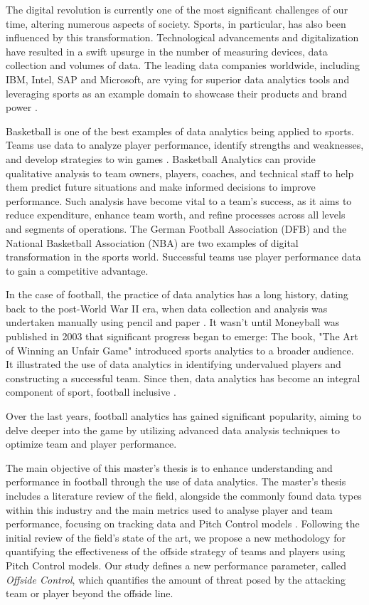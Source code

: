 \documentclass[
  10pt,
  twoside,nohyper]{book}
\begin{document}
The digital revolution is currently one of the most significant
challenges of our time, altering numerous aspects of society. Sports,
in particular, has also been influenced by this transformation.
Technological advancements and digitalization have resulted in a swift
upsurge in the number of measuring devices, data collection and volumes
of data. The leading data companies worldwide, including IBM, Intel, SAP
and Microsoft, are vying for superior data analytics tools and
leveraging sports as an example domain to showcase their products and
brand power \citep{1}.

Basketball is one of the best examples of data analytics being
applied to sports. Teams use data to analyze player performance, identify strengths and weaknesses, and develop strategies to win games \citep{2}. Basketball Analytics can provide qualitative analysis to team owners, players, coaches, and technical staff to help them predict future situations and make informed decisions to improve performance. Such analysis have become vital to a team's success, as it aims to reduce expenditure, enhance team worth, and refine processes across all levels and segments of operations. The German Football Association (DFB) and the National Basketball Association (NBA) are two examples of digital transformation in the sports world. Successful teams use player performance data to gain a competitive advantage.

In the case of football, the practice of data analytics has a long history, dating
back to the post-World War II era, when data collection and analysis was
undertaken manually using pencil and paper \citep{1}. It wasn't until
Moneyball was published in 2003 that significant progress began to
emerge: The book, "The Art of Winning an Unfair Game" introduced
sports analytics to a broader audience. It illustrated the use of data
analytics in identifying undervalued players and constructing a
successful team. Since then, data analytics has become an integral
component of sport, football inclusive \citep{1}.

Over the last years, football analytics has gained significant
popularity, aiming to delve deeper into the game by utilizing advanced
data analysis techniques to optimize team and player performance.

The main objective of this master's thesis is to enhance understanding and performance in football through the use of data analytics. The master's thesis includes a literature review of the field, alongside the commonly found data types within this industry and the main metrics used to analyse player and team performance, focusing on tracking data and Pitch Control models \citep{Spearman}. Following the initial review of the field's state of the art, we propose a new methodology for quantifying the effectiveness of the offside strategy of teams and players using Pitch Control models. Our study defines a new performance parameter, called \emph{Offside Control}, which quantifies the amount of threat posed by the attacking team or player beyond the offside line.
\end{document}

